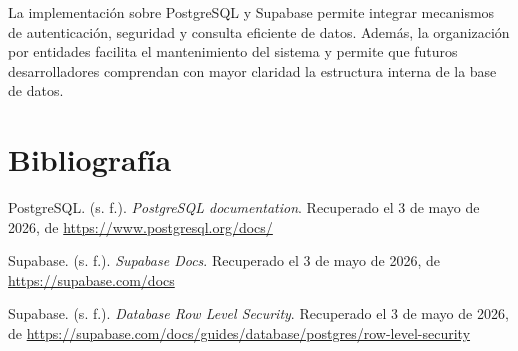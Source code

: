 \documentclass[12pt,letterpaper]{article}
\begin{document}
La implementación sobre PostgreSQL y Supabase permite integrar mecanismos de autenticación, seguridad y consulta eficiente de datos. Además, la organización por entidades facilita el mantenimiento del sistema y permite que futuros desarrolladores comprendan con mayor claridad la estructura interna de la base de datos.

\newpage
\section*{Bibliografía}

PostgreSQL. (s. f.). \textit{PostgreSQL documentation}. Recuperado el 3 de mayo de 2026, de \url{https://www.postgresql.org/docs/}

Supabase. (s. f.). \textit{Supabase Docs}. Recuperado el 3 de mayo de 2026, de \url{https://supabase.com/docs}

Supabase. (s. f.). \textit{Database Row Level Security}. Recuperado el 3 de mayo de 2026, de \url{https://supabase.com/docs/guides/database/postgres/row-level-security}
\end{document}
